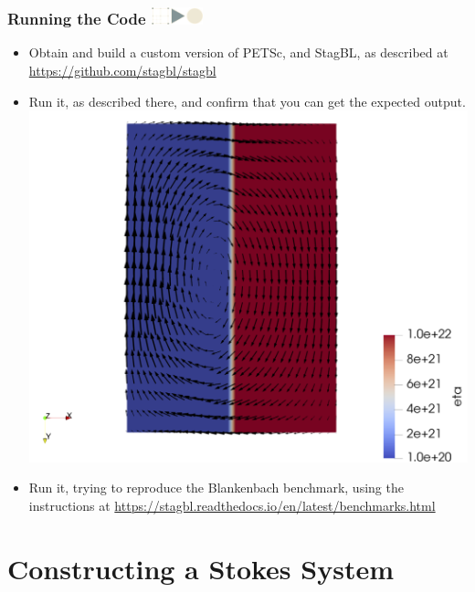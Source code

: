 \documentclass{beamer}
\newcommand\frametitlelogo[1]{\frametitle{#1\hspace{0pt plus 1 filll} \includegraphics[width=42pt]{logo_slides}}}
\begin{document}
\begin{frame}[fragile]
  \frametitlelogo{Running the Code}

  \begin{itemize}
  \item Obtain and build a custom version of PETSc, and StagBL, as described at
    \href{github.com/stagbl/stagbl}{https://github.com/stagbl/stagbl}
    \item Run it, as described there, and confirm that you can get the expected output.
  \includegraphics[height=0.4\textheight]{images/stagbldemo2d_quickstart.png}
\item Run it, trying to reproduce the Blankenbach benchmark, using the instructions at
  \href{stagbl.readthedocs.io}{https://stagbl.readthedocs.io/en/latest/benchmarks.html}
  \end{itemize}
\end{frame}

\section{Constructing a Stokes System}
\end{document}
